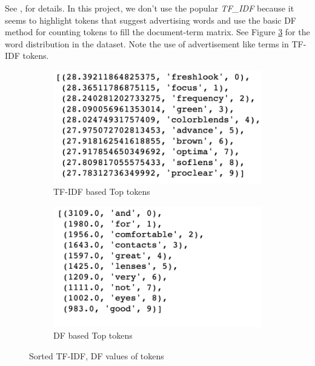 \documentclass[11pt, letterpaper]{article}
\begin{document}
See \autocite{documenttermmatrix}, \autocite{nlpbasics} for details. In this project, we don't use the popular \textit{TF\_IDF} because it seems to highlight tokens that suggest advertising words and use the basic DF method for counting tokens to fill the document-term matrix. See Figure \ref{fig:Word distribution plot} for the word distribution in the dataset. Note the use of advertisement like terms in TF-IDF tokens.
\begin{figure}[H]%
     \centering
     \begin{subfigure}[b]{0.45\textwidth}
         \centering
         \includegraphics[width=\textwidth]{tfidf.png}
         \caption{TF-IDF based Top tokens}
         \label{fig:tfidf}
     \end{subfigure}
     \hfill
     \begin{subfigure}[b]{0.45\textwidth}
         \centering
         \includegraphics[width=\textwidth]{df_words.png}
         \caption{DF based Top tokens}
         \label{fig:df}
     \end{subfigure}
        \caption{Sorted TF-IDF, DF values of tokens}
        \label{fig:Word distribution plot}
\end{figure}
\end{document}
